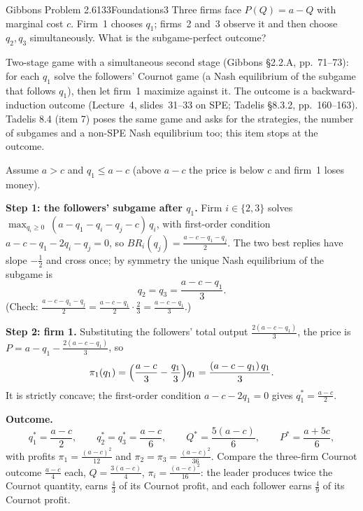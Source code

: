 \begin{exsol}{Gibbons Problem 2.6}{133}{Foundations}{3}
\asked Three firms face $P(Q) = a - Q$ with marginal cost $c$. Firm~1 chooses $q_1$; firms~2 and~3
observe it and then choose $q_2, q_3$ simultaneously. What is the subgame-perfect outcome?

\method Two-stage game with a simultaneous second stage (Gibbons \S2.2.A, pp.~71--73): for each
$q_1$ solve the followers' Cournot game (a Nash equilibrium of the subgame that follows $q_1$), then let
firm~1 maximize against it. The outcome is a backward-induction outcome (Lecture~4, slides~31--33 on SPE; Tadelis
\S8.3.2, pp.~160--163). Tadelis 8.4 (item 7) poses the same game and asks for the strategies, the number of subgames
and a non-SPE Nash equilibrium too; this item stops at the outcome.

\solution
Assume $a > c$ and $q_1 \le a - c$ (above $a - c$ the price is below $c$ and firm~1 loses money).

\textbf{Step 1: the followers' subgame after $q_1$.} Firm $i \in \{2,3\}$ solves
$\max_{q_i \ge 0}\ (a - q_1 - q_i - q_j - c)\,q_i$, with first-order condition
$a - c - q_1 - 2q_i - q_j = 0$, so $BR_i(q_j) = \frac{a-c-q_1-q_j}{2}$. The two best replies have slope $-\frac12$
and cross once; by symmetry the unique Nash equilibrium of the subgame is
\[
  q_2 = q_3 = \frac{a - c - q_1}{3}.
\]
(Check: $\frac{a-c-q_1-q_j}{2} = \frac{a-c-q_1}{2}\cdot\frac{2}{3} = \frac{a-c-q_1}{3}$.)

\textbf{Step 2: firm 1.} Substituting the followers' total output $\frac{2(a-c-q_1)}{3}$, the price is
$P = a - q_1 - \frac{2(a-c-q_1)}{3}$, so
\[
  \pi_1(q_1) = \Bigl(\frac{a-c}{3} - \frac{q_1}{3}\Bigr)q_1 = \frac{(a-c-q_1)\,q_1}{3}.
\]
It is strictly concave; the first-order condition $a - c - 2q_1 = 0$ gives $q_1^* = \frac{a-c}{2}$.

\textbf{Outcome.}
\[
  q_1^* = \frac{a-c}{2}, \qquad q_2^* = q_3^* = \frac{a-c}{6}, \qquad Q^* = \frac{5(a-c)}{6},
  \qquad P^* = \frac{a+5c}{6},
\]
with profits $\pi_1 = \frac{(a-c)^2}{12}$ and $\pi_2 = \pi_3 = \frac{(a-c)^2}{36}$. Compare the three-firm
Cournot outcome $\frac{a-c}{4}$ each, $Q = \frac{3(a-c)}{4}$, $\pi_i = \frac{(a-c)^2}{16}$: the leader
produces twice the Cournot quantity, earns $\frac{4}{3}$ of its Cournot profit, and each follower earns
$\frac{4}{9}$ of its Cournot profit.


\end{exsol}
